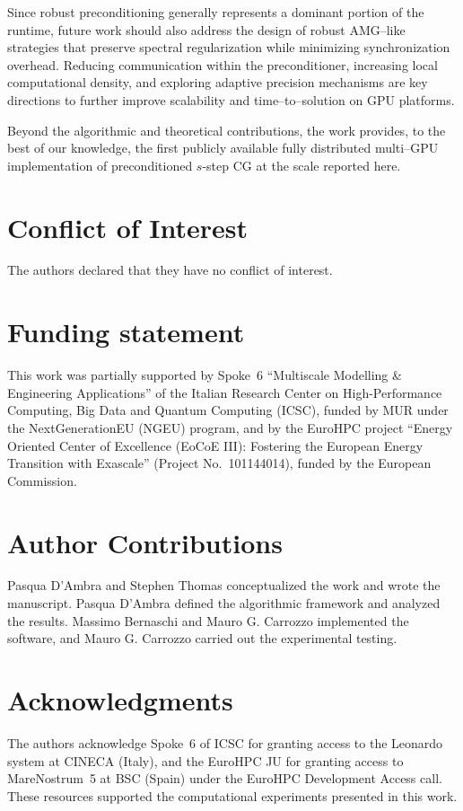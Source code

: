 \documentclass[pdflatex,sn-mathphys-num]{sn-jnl}%
\begin{document}
Since robust preconditioning generally represents a dominant portion of the runtime, future work should also address the design of robust AMG--like strategies that preserve spectral regularization while minimizing synchronization overhead. Reducing communication within the preconditioner, increasing local computational density, and exploring adaptive precision mechanisms are key directions to further improve scalability and time--to--solution on GPU platforms.

Beyond the algorithmic and theoretical contributions, the work provides,
to the best of our knowledge, the first publicly available fully distributed
multi--GPU implementation of preconditioned $s$-step CG at the scale
reported here.

\section*{Conflict of Interest}
The authors declared that they have no conflict of interest.

\section*{Funding statement}
This work was partially supported by Spoke~6 “Multiscale Modelling \& Engineering Applications” 
of the Italian Research Center on High-Performance Computing, Big Data and Quantum Computing (ICSC), 
funded by MUR under the NextGenerationEU (NGEU) program, and by the EuroHPC project 
“Energy Oriented Center of Excellence (EoCoE III): Fostering the European Energy Transition with Exascale” 
(Project No.~101144014), funded by the European Commission.

\section*{Author Contributions}
Pasqua D'Ambra and Stephen Thomas conceptualized the work and wrote the manuscript. Pasqua D'Ambra defined the algorithmic framework and analyzed the results. Massimo Bernaschi and Mauro G. Carrozzo implemented the software, and Mauro G. Carrozzo carried out the experimental testing.

\section*{Acknowledgments}
The authors acknowledge Spoke~6 of ICSC for granting access to the Leonardo system at CINECA (Italy), and the EuroHPC JU for granting access to MareNostrum~5 at BSC (Spain) under the EuroHPC Development Access call.
These resources supported the computational experiments presented in this work.

\end{document}
